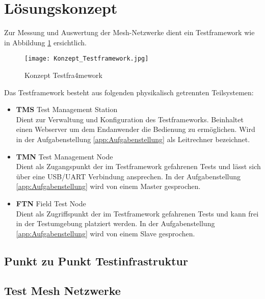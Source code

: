\clearpage
\section{Lösungskonzept}\label{sec:Loesungskonzept}

Zur Messung und Auswertung der Mesh-Netzwerke dient ein Testframework wie in Abbildung \ref{fig:KonzeptTestframework} ersichtlich.

\begin{figure}[H]
	\centering
	\texttt{[image: Konzept\_Testframework.jpg]}
	\caption{Konzept Testfra4mework}\label{fig:KonzeptTestframework}
\end{figure}


Das Testframework besteht aus folgenden physikalisch getrennten Teilsystemen:

\begin{itemize}
	\item \textbf{TMS} Test Management Station \\ 
	Dient zur Verwaltung und Konfiguration des Testframeworks. Beinhaltet einen Webserver um dem Endanwender die Bedienung zu ermöglichen. Wird in der Aufgabenstellung \ref{app:Aufgabenstellung} als Leitrechner bezeichnet. 
	\item \textbf{TMN} Test Management Node \\ 
	Dient als Zugangspunkt der im Testframework gefahrenen Tests und lässt sich über eine USB/UART Verbindung ansprechen. In der Aufgabenstellung \ref{app:Aufgabenstellung} wird von einem Master gesprochen. 
	\item \textbf{FTN} Field Test Node \\ 
	Dient als Zugriffspunkt der im Testframework gefahrenen Tests und kann frei in der Testumgebung platziert werden. In der Aufgabenstellung  \ref{app:Aufgabenstellung} wird von einem Slave gesprochen. 
\end{itemize}



\subsection{Punkt zu Punkt Testinfrastruktur}\label{subsec:PunktzuPunktTestinfrastruktur}


\subsection{Test Mesh Netzwerke}\label{subsec:TestMeshNetzwerke}

